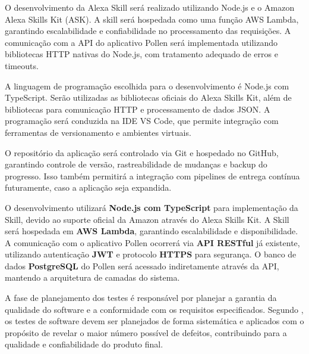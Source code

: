 O desenvolvimento da Alexa Skill será realizado utilizando Node.js e o Amazon Alexa Skills Kit (ASK). 
A skill será hospedada como uma função AWS Lambda, garantindo escalabilidade e confiabilidade no processamento das requisições. 
A comunicação com a API do aplicativo Pollen será implementada utilizando bibliotecas HTTP nativas do Node.js, com tratamento adequado de erros e timeouts.

A linguagem de programação escolhida para o desenvolvimento é Node.js com TypeScript. 
Serão utilizadas as bibliotecas oficiais do Alexa Skills Kit, além de bibliotecas para comunicação HTTP e processamento de dados JSON. 
A programação será conduzida na IDE VS Code, que permite integração com ferramentas de versionamento e ambientes virtuais.

O repositório da aplicação será controlado via Git e hospedado no GitHub, garantindo controle de versão, rastreabilidade de mudanças e backup do progresso. 
Isso também permitirá a integração com pipelines de entrega contínua futuramente, caso a aplicação seja expandida.

\label{sssec:tecnologias}

O desenvolvimento utilizará \textbf{Node.js com TypeScript} para implementação da Skill, devido ao suporte oficial da Amazon através do Alexa Skills Kit. A Skill será hospedada em \textbf{AWS Lambda}, garantindo escalabilidade e disponibilidade. A comunicação com o aplicativo Pollen ocorrerá via \textbf{API RESTful} já existente, utilizando autenticação \textbf{JWT} e protocolo \textbf{HTTPS} para segurança. O banco de dados \textbf{PostgreSQL} do Pollen será acessado indiretamente através da API, mantendo a arquitetura de camadas do sistema.

\label{sssec:testes}

A fase de planejamento dos testes é responsável por planejar a garantia da qualidade do software e a conformidade com os requisitos especificados. 
Segundo \textcite{pressman2011}, os testes de software devem ser planejados de forma sistemática e aplicados com o propósito de revelar o maior número possível de defeitos, contribuindo para a qualidade e confiabilidade do produto final.

